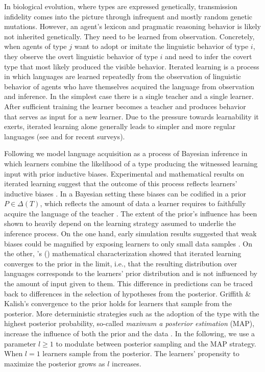 \documentclass[a4paper, 11pt]{article}
\theoremstyle{Satz}
\newcommand{\citeposs}[2][]{\citeauthor{#2}'s (\citeyear[#1]{#2})}
\begin{document}
In biological evolution, where types are expressed genetically, transmission infidelity comes
into the picture through infrequent and mostly random genetic mutations. However, an agent's
lexicon and pragmatic reasoning behavior is likely not inherited genetically. They need to be
learned from observation. Concretely, when agents of type $j$ want to adopt or imitate the
linguistic behavior of type $i$, they observe the overt linguistic behavior of type $i$ and
need to infer the covert type that most likely produced the visible behavior. Iterated learning
is a process in which languages are learned repeatedly from the observation of linguistic
behavior of agents who have themselves acquired the language from observation and inference. In
the simplest case there is a single teacher and a single learner. After sufficient training the
learner becomes a teacher and produces behavior that serves as input for a new learner. Due to
the pressure towards learnability it exerts, iterated learning alone generally leads to simpler
and more regular languages (see \citealt{kirby+etal:2014} and \citealt{tamariz+kirby:2016} for
recent surveys).

Following \citet{griffiths+kalish:2007} we model language acquisition as a process of Bayesian
inference in which learners combine the likelihood of a type producing the witnessed learning
input with prior inductive biases. Experimental and mathematical results on iterated learning
suggest that the outcome of this process reflects learners' inductive biases
\citep[e.g.,][]{kirby+etal:2014}. In a Bayesian setting these biases can be codified in a prior
$P \in \Delta(T)$, which reflects the amount of data a learner requires to faithfully acquire
the language of the teacher \citep[cf.][450]{griffiths+kalish:2007}. The extent of the prior's
influence has been shown to heavily depend on the learning strategy assumed to underlie the
inference process. On the one hand, early simulation results suggested that weak biases could
be magnified by exposing learners to only small data samples
\citep[e.g. in][]{brighton:2002}. On the other, \citeposs{griffiths+kalish:2007} mathematical
characterization showed that iterated learning converges to the prior in the limit, i.e., that
the resulting distribution over languages corresponds to the learners' prior distribution and
is not influenced by the amount of input given to them. This difference in predictions can be
traced back to differences in the selection of hypotheses from the posterior. Griffith \&
Kalish's convergence to the prior holds for learners that sample from the posterior. More
deterministic strategies such as the adoption of the type with the highest posterior
probability, so-called {\it maximum a posterior estimation} (MAP), increase the influence of
both the prior and the data \citep{griffiths+kalish:2007,kirby+etal:2007}. In the following, we
use a parameter $l\ge1$ to modulate between posterior sampling and the MAP strategy. When
$l = 1$ learners sample from the posterior. The learners' propensity to maximize the posterior
grows as $l$ increases.
\end{document}
